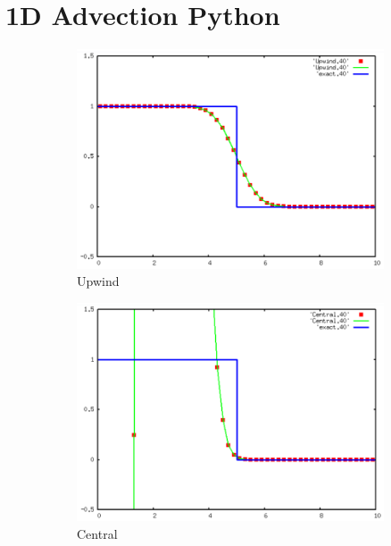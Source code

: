 \documentclass[12pt, a4paper]{article}
\begin{document}
\section{1D Advection Python}
\begin{figure}[H]
	\begin{subfigure}[b]{0.48\textwidth}
		\centering
		\includegraphics[width=\textwidth]{python/upwind}
		\caption{Upwind}
		\label{fig:upwind}
	\end{subfigure}
	\hfill
	\begin{subfigure}[b]{0.48\textwidth}
		\centering
		\includegraphics[width=\textwidth]{python/central}
		\caption{Central}
		\label{fig:central}
	\end{subfigure}
	\hfill
	\begin{subfigure}[b]{0.48\textwidth}

\end{subfigure}
\end{figure}
\end{document}
